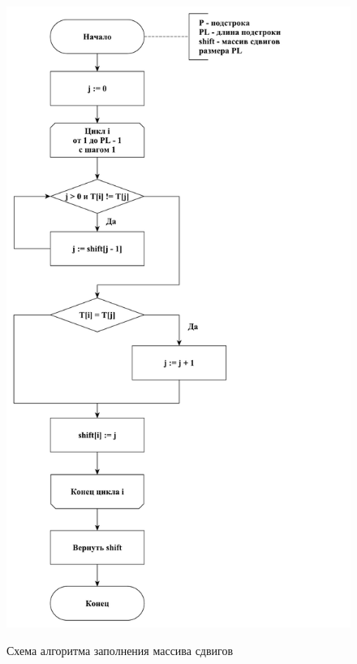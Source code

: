 \documentclass[a4paper,12pt]{article}
\begin{document}
\begin{figure}[h!]
\begin{center}
{\includegraphics[scale = 0.4]{diagram/shift.pdf}}
\caption{
Схема алгоритма заполнения массива сдвигов}
\label{fig:shift}
\end{center}
\end{figure}

\pagebreak
\end{document}
